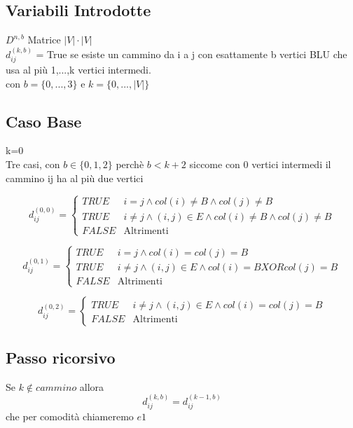 \documentclass[12pt, a4paper, openany]{book}
\begin{document}
\subsection*{Variabili Introdotte}
$D^{n,b}$ Matrice $|V|\cdot|V|$\\
$d^{(k,b)}_{ij}$ = True se esiste un cammino da i a j con esattamente b vertici BLU che usa al più {1,...,k} vertici intermedi.\\
con $b = \{0,...,3\}$ e $k=\{0,...,|V|\}$

\subsection*{Caso Base} k=0\\
Tre casi, con $b \in \{0,1,2\}$ perchè $b < k+2$ siccome con 0 vertici intermedi il cammino ij ha al più due vertici

\begin{equation*}
	d_{ij}^{(0,0)} = \begin{cases}
		TRUE  & i=j\land col(i)\neq B\land col(j)\neq B                      \\
		TRUE  & i\neq j\land (i,j)\in E \land col(i)\neq B\land col(j)\neq B \\
		FALSE & \text{Altrimenti}
	\end{cases}
\end{equation*}

\begin{equation*}
	d_{ij}^{(0,1)} = \begin{cases}
		TRUE  & i=j\land col(i)= col(j) = B                          \\
		TRUE  & i\neq j\land (i,j)\in E \land col(i)= B XOR col(j)=B \\
		FALSE & \text{Altrimenti}
	\end{cases}
\end{equation*}

\begin{equation*}
	d_{ij}^{(0,2)} = \begin{cases}
		TRUE  & i\neq j\land (i,j)\in E \land col(i)= col(j)= B \\
		FALSE & \text{Altrimenti}
	\end{cases}
\end{equation*}

\subsection*{Passo ricorsivo}
Se $k \notin cammino$ allora
\begin{equation*}
	d_{ij}^{(k,b)} = d_{ij}^{(k-1,b)}
\end{equation*}
che per comodità chiameremo $e1$
\end{document}
